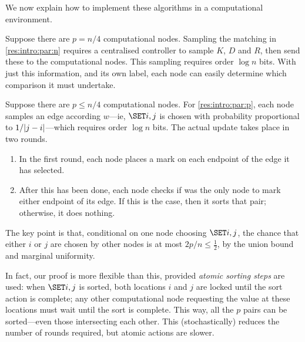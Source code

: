 \documentclass{article}
\begin{document}

We now explain how to implement these algorithms in a computational environment.


\begin{rmkt}
\label{rmk:intro:par:n}
Suppose there are $p = n/4$ computational nodes.
Sampling the matching in \cref{res:intro:par:n} requires a centralised controller to sample $K$, $D$ and $R$, then send these to the computational nodes.
This sampling requires order $\log n$ bits.
With just this information, and its own label, each node can easily determine which comparison it must undertake.
\end{rmkt}

\begin{rmkt}
\label{rmk:intro:par:p}
Suppose there are $p \le n/4$ computational nodes.
For \cref{res:intro:par:p},
each node samples an edge according $w$---ie, $\set{i,j}$ is chosen with probability proportional to $1/| j - i |$---which requires order $\log n$ bits.
The actual update takes place in two rounds.

\begin{enumerate}%
	\item 
	In the first round, each node places a mark on each endpoint of the edge it has selected.
	
	\item 
	After this has been done, each node checks if was the only node to mark either endpoint of its edge.
	If this is the case, then it sorts that pair; otherwise, it does nothing.
\end{enumerate}
The key point is that, conditional on one node choosing $\set{i,j}$,
the chance that either $i$ or $j$ are chosen by other nodes is at most $2p/n \le \tfrac12$, by the union bound and marginal uniformity.

In fact, our proof is more flexible than this, provided \textit{atomic sorting steps} are used:
	when $\set{i,j}$ is sorted, both locations $i$ and $j$ are locked until the sort action is complete;
	any other computational node requesting the value at these locations must wait until the sort is complete.
This way, all the $p$ pairs can be sorted---even those intersecting each other.
This (stochastically) reduces the number of rounds required, but atomic actions are slower.
\end{rmkt}
\end{document}

